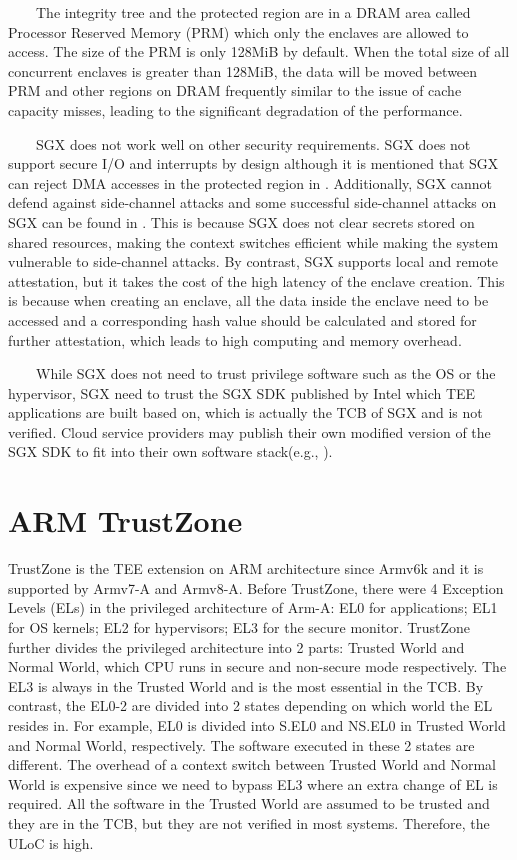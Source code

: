 \documentclass[12pt,twoside]{report}
\begin{document}
\ \ \ \ The integrity tree and the protected region are in a DRAM area called Processor Reserved Memory (PRM) which only the enclaves are allowed to access. The size of the PRM is only 128MiB by default. When the total size of all concurrent enclaves is greater than 128MiB, the data will be moved between PRM and other regions on DRAM frequently similar to the issue of cache capacity misses, leading to the significant degradation of the performance.

\ \ \ \ SGX does not work well on other security requirements. SGX does not support secure I/O and interrupts by design although it is mentioned that SGX can reject DMA accesses in the protected region in \cite{costan2016intel}. Additionally, SGX cannot defend against side-channel attacks and some successful side-channel attacks on SGX can be found in \cite{nilsson2020survey}. This is because SGX does not clear secrets stored on shared resources\cite{costan2016intel}, making the context switches efficient while making the system vulnerable to side-channel attacks. By contrast, SGX supports local and remote attestation, but it takes the cost of the high latency of the enclave creation. This is because when creating an enclave, all the data inside the enclave need to be accessed and a corresponding hash value should be calculated and stored for further attestation, which leads to high computing and memory overhead. 

\ \ \ \ While SGX does not need to trust privilege software such as the OS or the hypervisor, SGX need to trust the SGX SDK\cite{sgx-sdk} published by Intel which TEE applications are built based on, which is actually the TCB of SGX and is not verified. Cloud service providers may publish their own modified version of the SGX SDK to fit into their own software stack(e.g., \cite{ali-container}).

\section{ARM TrustZone}

TrustZone\cite{trustzone-intro} is the TEE extension on ARM architecture since Armv6k and it is supported by Armv7-A and Armv8-A. Before TrustZone, there were 4 Exception Levels (ELs) in the privileged architecture of Arm-A: EL0 for applications; EL1 for OS kernels; EL2 for hypervisors; EL3 for the secure monitor. TrustZone further divides the privileged architecture into 2 parts: Trusted World and Normal World, which CPU runs in secure and non-secure mode respectively. The EL3 is always in the Trusted World and is the most essential in the TCB. By contrast, the EL0-2 are divided into 2 states depending on which world the EL resides in. For example, EL0 is divided into S.EL0 and NS.EL0 in Trusted World and Normal World, respectively. The software executed in these 2 states are different. The overhead of a context switch between Trusted World and Normal World is expensive since we need to bypass EL3 where an extra change of EL is required. All the software in the Trusted World are assumed to be trusted and they are in the TCB, but they are not verified in most systems. Therefore, the ULoC is high.
\end{document}
